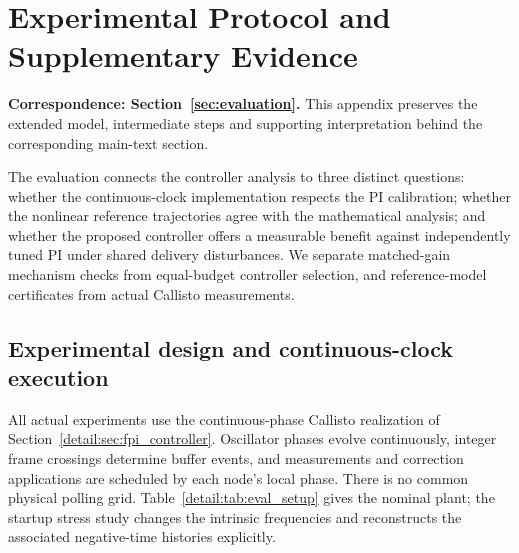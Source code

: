 \section{Experimental Protocol and Supplementary Evidence}
\label{app:evaluation}
\noindent\textbf{Correspondence: Section~\ref{sec:evaluation}.} This appendix preserves the extended model, intermediate steps and supporting interpretation behind the corresponding main-text section.


\label{detail:sec:evaluation}

The evaluation connects the controller analysis to three distinct questions:
whether the continuous-clock implementation respects the PI calibration;
whether the nonlinear reference trajectories agree with the mathematical
analysis; and whether the proposed controller offers a measurable benefit
against independently tuned PI under shared delivery disturbances. We
separate matched-gain mechanism checks from equal-budget controller
selection, and reference-model certificates from actual Callisto measurements.

\subsection{Experimental design and continuous-clock execution}
\label{detail:subsec:eval_design}

All actual experiments use the continuous-phase Callisto realization of
Section~\ref{detail:sec:fpi_controller}. Oscillator phases evolve continuously,
integer frame crossings determine buffer events, and measurements and
correction applications are scheduled by each node's local phase. There
is no common physical polling grid. Table~\ref{detail:tab:eval_setup} gives the
nominal plant; the startup stress study changes the intrinsic frequencies
and reconstructs the associated negative-time histories explicitly.

